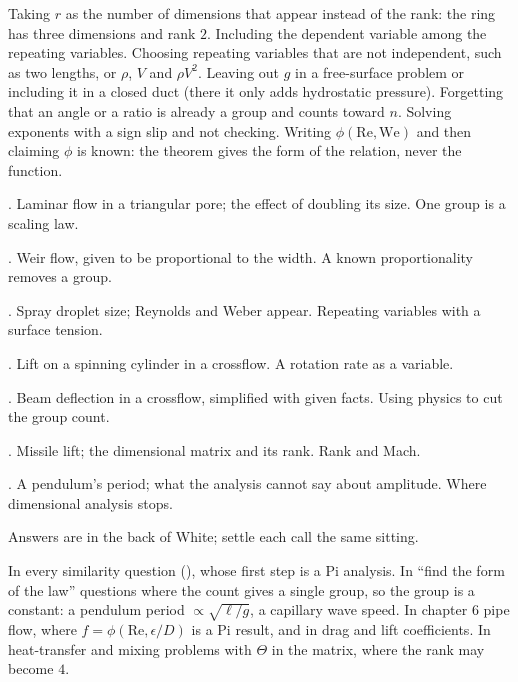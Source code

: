 \begin{trap}
Taking $r$ as the number of dimensions that appear instead of the rank: the ring has three dimensions and rank $2$. Including the dependent variable among the repeating variables. Choosing repeating variables that are not independent, such as two lengths, or $\rho$, $V$ and $\rho V^2$. Leaving out $g$ in a free-surface problem or including it in a closed duct (there it only adds hydrostatic pressure). Forgetting that an angle or a ratio is already a group and counts toward $n$. Solving exponents with a sign slip and not checking. Writing $\phi(\mathrm{Re}, \mathrm{We})$ and then claiming $\phi$ is known: the theorem gives the form of the relation, never the function.
\end{trap}

\begin{ladder}
\item {}. Laminar flow in a triangular pore; the effect of doubling its size. One group is a scaling law.
\item {}. Weir flow, given to be proportional to the width. A known proportionality removes a group.
\item {}. Spray droplet size; Reynolds and Weber appear. Repeating variables with a surface tension.
\item {}. Lift on a spinning cylinder in a crossflow. A rotation rate as a variable.
\item {}. Beam deflection in a crossflow, simplified with given facts. Using physics to cut the group count.
\item {}. Missile lift; the dimensional matrix and its rank. Rank and Mach.
\item {}. A pendulum's period; what the analysis cannot say about amplitude. Where dimensional analysis stops.
\end{ladder}
Answers are in the back of White; settle each call the same sitting.


\begin{hides}
In every similarity question (), whose first step is a Pi analysis. In ``find the form of the law'' questions where the count gives a single group, so the group is a constant: a pendulum period $\propto\sqrt{\ell/g}$, a capillary wave speed. In chapter 6 pipe flow, where $f = \phi(\mathrm{Re}, \epsilon/D)$ is a Pi result, and in drag and lift coefficients. In heat-transfer and mixing problems with $\Theta$ in the matrix, where the rank may become $4$.
\end{hides}
